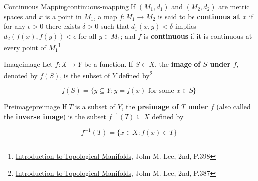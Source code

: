 \begin{Definition}{Continuous Mapping}{continuous-mapping}
    If $(M_1, d_1)$ and $(M_2, d_2)$ are metric spaces and $x$ is a point in $M_1$, a map $f: M_1 \rightarrow M_2$ is
    said to be \textbf{continous at $x$} if for any $\epsilon > 0$ there exists $\delta > 0$ such that
    $d_1(x, y) < \delta$ implies $d_2(f(x), f(y)) < \epsilon$ for all $y \in M_1$; and $f$ is \textbf{continuous} if it
    is continuous at every point of $M_1$\footnote{\href{https://trello.com/c/SI33o8fG}{Introduction to Topological Manifolds}, John M. Lee, 2nd, P.398}
\end{Definition}

\begin{Definition}{Image}{image}
    Let $f: X \rightarrow Y$ be a function. If $S \subset X$, the \textbf{image of $S$ under $f$}, denoted by $f(S)$, is
    the subset of $Y$ defined by\footnote{\href{https://trello.com/c/SI33o8fG}{Introduction to Topological Manifolds}, John M. Lee, 2nd, P.387}

    \begin{equation}
        f(S) = \{ y \subseteq Y: y = f(x) \text{ for some } x \in S \}
    \end{equation}
\end{Definition}

\begin{Definition}{Preimage}{preimage}
    If $T$ is a subset of $Y$, the \textbf{preimage of $T$ under $f$} (also called the \textbf{inverse image}) is the
    subset $f^{-1}(T) \subseteq X$ defined by

    \begin{equation}
        f^{-1}(T) = \{ x \in X : f(x) \in T \}
    \end{equation}
\end{Definition}

